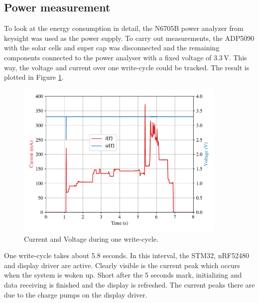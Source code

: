 \subsection{Power measurement}
To look at the energy consumption in detail, the N6705B power analyzer from keysight was used as the power supply.
To carry out measurements, the ADP5090 with the solar cells and super cap was disconnected and the remaining components connected to the power analyser with a fixed voltage of 3.3\,V.
This way, the voltage and current over one write-cycle could be tracked.
The result is plotted in Figure \ref{results:ui}.
\begin{figure}[ht]
	\centering
	\includegraphics[width=0.9\textwidth]{5-results/energy/logger/ui.pdf}
	\caption{Current and Voltage during one write-cycle.\label{results:ui}}
\end{figure}
One write-cycle takes about 5.8 seconds.
In this interval, the STM32, nRF52480 and display driver are active.
Clearly visible is the current peak which occurs when the system is woken up.
Short after the 5 seconds mark, initializing and data receiving is finished and the display is refreshed.
The current peaks there are due to the charge pumps on the display driver.

